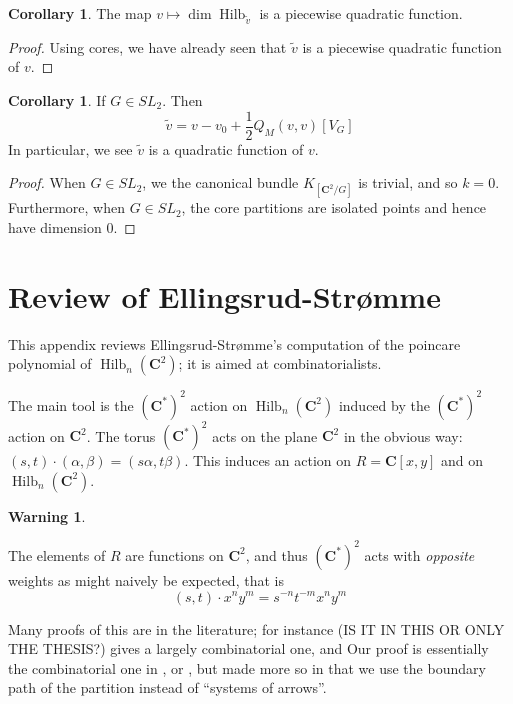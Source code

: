 \documentclass{amsart}[12pt]
\theoremstyle{definition}
\newtheorem{corollary}[dummy]{Corollary}
\newtheorem{warning}[dummy]{Warning}
\newcommand{\C}{\mathbf{C}}
\DeclareMathOperator{\Hilb}{Hilb}
\begin{document}
\begin{corollary}
The map $v\mapsto \dim\Hilb_{\tilde{v}}$ is a piecewise quadratic function.
\end{corollary}

\begin{proof}
Using cores, we have already seen that $\tilde{v}$ is a piecewise quadratic function of $v$.  
\end{proof}


\begin{corollary}  If $G\in SL_2$. Then
$$\tilde{v}=v-v_0+\frac{1}{2}Q_M(v,v)[V_G]$$
In particular, we see $\tilde{v}$ is a quadratic function of $v$.
\end{corollary}

\begin{proof}
When $G\in SL_2$, we the canonical bundle $K_{[\C^2/G]}$ is trivial, and so $k=0$.  Furthermore, when $G\in SL_2$, the core partitions are isolated points and hence have dimension 0.
\end{proof}






\appendix

\section{Review of Ellingsrud-Str\o mme}
This appendix reviews Ellingsrud-Str\o mme's computation of the poincare polynomial of $\Hilb_n(\C^2)$; it is aimed at combinatorialists.  

The main tool is the $(\C^*)^2$ action on $\Hilb_n(\C^2)$ induced by the $(\C^*)^2$ action on $\C^2$.  The torus $(\C^*)^2$ acts on the plane $\C^2$ in the obvious way: $(s,t)\cdot (\alpha,\beta)=(s\alpha,t\beta)$.  This induces an action on $R=\C[x,y]$ and on $\Hilb_n(\C^2)$.  

\begin{warning} \label{warning:action-sign}

 The elements of $R$ are functions on $\C^2$, and thus $(\C^*)^2$ acts with \emph{opposite} weights as might naively be expected, that is 
$$(s,t)\cdot x^ny^m=s^{-n}t^{-m}x^ny^m$$
\end{warning}




Many proofs of this are in the literature; for instance \cite{cheah} (IS IT IN THIS OR ONLY THE THESIS?) gives a largely combinatorial one, and \cite{nakajimabook}   Our proof is essentially the combinatorial one in \cite{cheah}, or , but made more so in that we use the boundary path of the partition instead of ``systems of arrows''.  
\end{document}
